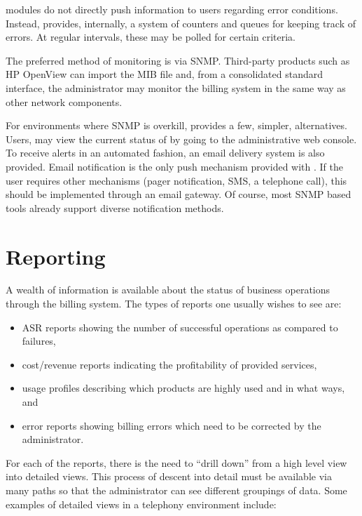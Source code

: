 		\XCDR{} modules do not directly push information to users
		regarding error conditions. Instead, \XCDR{} provides, internally, a
		system of counters and queues for keeping track of errors. At regular
		intervals, these may be polled for certain criteria.

		The preferred method of monitoring \XCDR{} is via SNMP.
		Third-party products such as HP OpenView can import the \XCDR{} MIB
		file and, from a consolidated standard interface, the administrator may
		monitor the billing system in the same way as other network components.

		For environments where SNMP is overkill, \XCDR{} provides a few,
		simpler, alternatives. Users, may view the current status of \XCDR{}
		by going to the administrative web console. To receive alerts in an
		automated fashion, an email delivery system is also provided. Email
		notification is the only push mechanism provided with \XCDR{}. If the
		user requires other mechanisms (pager notification, SMS, a telephone
		call), this should be implemented through an email gateway.  Of course,
		most SNMP based tools already support diverse notification methods.

	\section{Reporting}
		A wealth of information is available about the status of business
		operations through the billing system. The types of
		reports one usually wishes to see are:

		\begin{itemize}
		\item ASR reports showing the number of successful operations as compared
		      to failures,
		\item cost/revenue reports indicating the profitability of provided
		      services,
		\item usage profiles describing which products are highly used and
		      in what ways, and
		\item error reports showing billing errors which need to be corrected
		      by the administrator.
		\end{itemize}

		For each of the reports, there is the need to ``drill down'' from a
		high level view into detailed views. This process of descent into detail
		must be available via many paths so that the administrator can see
		different groupings of data. Some examples of detailed views in a
		telephony environment include:

